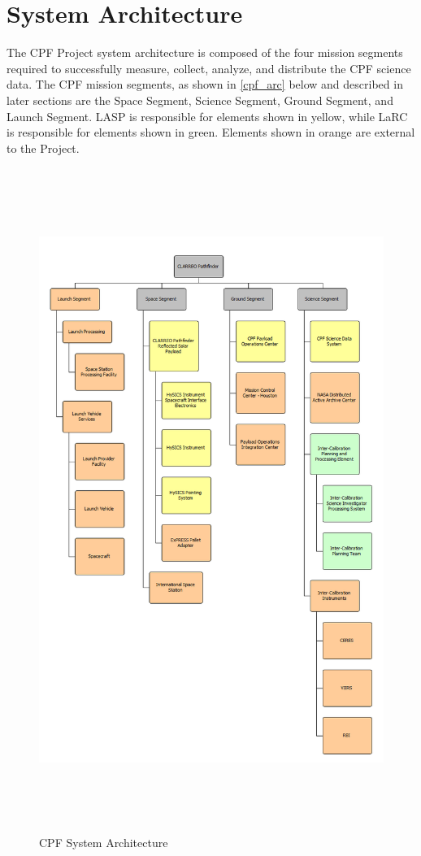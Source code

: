 \section{System Architecture }
\label{systemarchitecture}

The \gls{CPF} Project system architecture is composed of the four mission segments required to successfully \gls{measure}, \gls{collect}, analyze, and distribute the \gls{CPF} science data. The \gls{CPF} mission segments, as shown in \autoref{cpf_arc} below and described in later sections are the Space Segment, Science Segment, Ground Segment, and Launch Segment. \gls{LASP} is responsible for elements shown in yellow, while \gls{LaRC} is responsible for elements shown in green. Elements shown in orange are external to the Project.

\begin{figure}[htbp]
\centering
\includegraphics[keepaspectratio,width=\textwidth,height=8.5in]{20171214_cpf_architecture_l1-4.png}
\caption{\gls{CPF} System Architecture}
\label{cpf_arc}
\end{figure}

